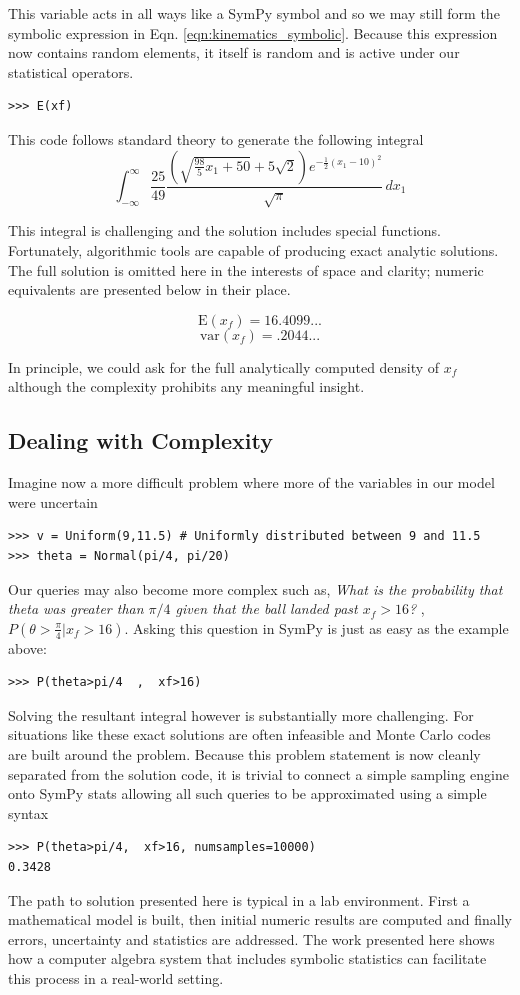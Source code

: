 This variable acts in all ways like a SymPy symbol and so we may still form the
symbolic expression in Eqn. \ref{eqn:kinematics_symbolic}. 
Because this expression now contains random elements, it itself is random and is active under our statistical operators.

\begin{lstlisting}
>>> E(xf)
\end{lstlisting}

This code follows standard theory to generate the following integral
$$\int_{-\infty}^{\infty} \frac{25}{49} \frac{\left(\sqrt{\frac{98}{5} x_{1} + 50} + 5 \sqrt{2}\right) e^{- \frac{1}{2} \left(x_{1} -10\right)^{2}}}{\sqrt{\pi}}\, dx_{1}$$

This integral is challenging and the solution includes special
functions. Fortunately, algorithmic tools are capable of producing exact
analytic solutions. The full solution is omitted here in the interests of space and clarity; numeric equivalents are presented below in their place. 

$$\textrm{E}(x_f) = 16.4099...$$
$$\textrm{var}(x_f) = .2044...$$

In principle, we could ask for the full analytically computed density of $x_f$
although the complexity prohibits any meaningful insight.

\subsection{Dealing with Complexity}

Imagine now a more difficult problem where more of the variables in our model were uncertain
\begin{lstlisting}
>>> v = Uniform(9,11.5) # Uniformly distributed between 9 and 11.5
>>> theta = Normal(pi/4, pi/20)
\end{lstlisting}

Our queries may also become more complex such as, \textit{What is the
probability that theta was greater than $\pi/4$ given that the ball landed
past $x_f>16$?} , $P(\theta>\frac{\pi}{4} | x_f>16)$. Asking this question in
SymPy is just as easy as the example above:
\begin{lstlisting}
>>> P(theta>pi/4  ,  xf>16)
\end{lstlisting}
Solving the resultant integral however is substantially more challenging. For
situations like these exact solutions are often infeasible and Monte Carlo
codes are built around the problem. Because this problem statement is now
cleanly separated from the solution code, it is trivial to connect a simple
sampling engine onto SymPy stats allowing all such queries to be approximated
using a simple syntax
\begin{lstlisting}
>>> P(theta>pi/4,  xf>16, numsamples=10000)
0.3428
\end{lstlisting}

The path to solution presented here is typical in a lab environment. First a mathematical model is built, then initial numeric results are computed and finally errors, uncertainty and statistics are addressed. The work presented here shows how a computer algebra system that includes symbolic statistics can facilitate this process in a real-world setting.

